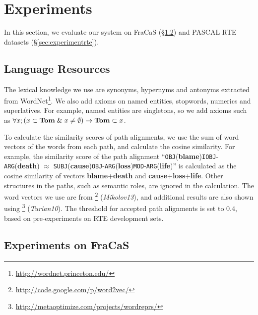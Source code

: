 \documentclass[11pt]{article}
\begin{document}
\section{Experiments}
\label{sec:experiments}

In this section, we evaluate our system on FraCaS (\S\ref{sec:experimentfracas}) and 
PASCAL RTE datasets (\S\ref{sec:experimentrte}).

\subsection{Language Resources}
\label{sec:implementation}

The lexical knowledge we use are synonyms, hypernyms and 
antonyms extracted from WordNet\footnote{\url{http://wordnet.princeton.edu/}}. 
We also add axioms on named entities, 
stopwords, numerics and superlatives. For example, named entities 
are singletons, so we add axioms such as 
$\forall x; (x\subset\mbox{\textbf{Tom}} \;\&\; 
x\neq\emptyset)\rightarrow\mbox{\textbf{Tom}}\subset x$. 

To calculate the similarity scores of path alignments, we use the sum of 
word vectors of the words from each path, and calculate the cosine similarity. 
For example, the similarity score of the path alignment 
``\texttt{OBJ}(\textbf{blame})\texttt{IOBJ}-\texttt{ARG}(\textbf{death}) $\approx$ 
\texttt{SUBJ}(\textbf{cause})\texttt{OBJ}-\texttt{ARG}(\textbf{loss})\texttt{MOD}-\texttt{ARG}(\textbf{life})'' is calculated as the cosine similarity of vectors 
\textbf{blame}+\textbf{death} and \textbf{cause}+\textbf{loss}+\textbf{life}. 
Other structures in the paths, such as semantic roles, are ignored in the calculation. 
The word vectors we use are from
\footnote{\url{http://code.google.com/p/word2vec/}} (\textit{Mikolov13}), 
and additional results are also shown using 
\footnote{\url{http://metaoptimize.com/projects/wordreprs/}}
(\textit{Turian10}). 
The threshold for accepted path alignments is set to $0.4$, 
based on pre-experiments on RTE development sets.

\subsection{Experiments on FraCaS}
\label{sec:experimentfracas}
\end{document}
